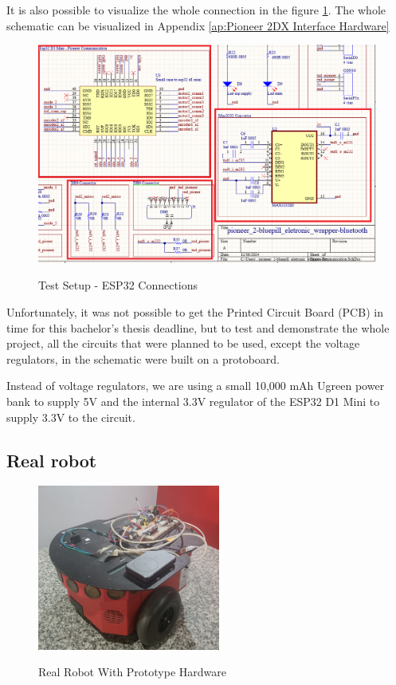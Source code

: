 \documentclass[../../monografia.tex]{subfiles}
\begin{document}
It is also possible to visualize the whole connection in the figure \ref{fig: Test Setup - ESP32 Connections}. The whole schematic can be visualized in Appendix \ref{ap:Pioneer 2DX Interface Hardware}

\begin{figure}[h!]
    \caption{Test Setup - ESP32 Connections}
    \centering
    \includegraphics[width=16cm]{test_setup-hardware_connection.png}
    \label{fig: Test Setup - ESP32 Connections}
\end{figure}

Unfortunately, it was not possible to get the Printed Circuit Board (PCB) in time for this bachelor's thesis deadline, but to test and demonstrate the whole project, all the circuits that were planned to be used, except the voltage regulators, in the schematic were built on a protoboard.

Instead of voltage regulators, we are using a small 10,000 mAh Ugreen power bank \cite{ugreen_powerbank_24} to supply 5V and the internal 3.3V regulator of the ESP32 D1 Mini to supply 3.3V to the circuit. 


\clearpage

\subsection{Real robot}

\begin{figure}
    \centering
    \caption{Real Robot With Prototype Hardware}
    \includegraphics[width=6cm]{real_robot_completed.jpg}
    \label{fig: Real Robot With Prototype Hardware}
\end{figure}
\end{document}
